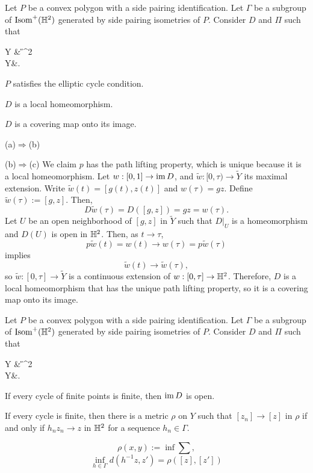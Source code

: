 \documentclass[a4paper]{article}
\begin{document}
\begin{prb}
Let $P$ be a convex polygon with a side pairing identification.
Let $\Gamma$ be a subgroup of $\operatorname{Isom}^+(\mathbb{H}^2)$ generated by side pairing isometries of $P$.
Consider $D$ and $\Pi$ such that
\begin{cd}
\tilde Y\dar{\Pi} & \H^2\\
Y&.
\end{cd}
\begin{parts}
\item $P$ satisfies the elliptic cycle condition.
\item $D$ is a local homeomorphism.
\item $D$ is a covering map onto its image.
\end{parts}
\end{prb}
\begin{pf}
(a)$\Rightarrow$(b)

(b)$\Rightarrow$(c)
We claim $p$ has the path lifting property, which is unique because it is a local homeomorphism.
Let $w:[0,1]\to\operatorname{im} D$, and $\tilde w:[0,\tau)\to\tilde Y$ its maximal extension.
Write $\tilde w(t)=[g(t),z(t)]$ and $w(\tau)=gz$.
Define $\tilde w(\tau):=[g,z]$.
Then,
\[D\tilde w(\tau)=D([g,z])=gz=w(\tau).\]
Let $U$ be an open neighborhood of $[g,z]$ in $\tilde Y$ such that $D|_U$ is a homeomorphism and $D(U)$ is open in $\mathbb{H}^2$.
Then, as $t\to\tau$,
\[p\tilde w(t)=w(t)\to w(\tau)=p\tilde w(\tau)\]
implies
\[\tilde w(t)\to\tilde w(\tau),\]
so $\tilde w:[0,\tau]\to\tilde Y$ is a continuous extension of $w:[0,\tau]\to\mathbb{H}^2$.
Therefore, $D$ is a local homeomorphism that has the unique path lifting property, so it is a covering map onto its image.
\end{pf}

\begin{prb}
Let $P$ be a convex polygon with a side pairing identification.
Let $\Gamma$ be a subgroup of $\operatorname{Isom}^+(\mathbb{H}^2)$ generated by side pairing isometries of $P$.
Consider $D$ and $\Pi$ such that
\begin{cd}
\tilde Y\dar{\Pi} & \H^2\\
Y&.
\end{cd}
\begin{parts}
\item If every cycle of finite points is finite, then $\operatorname{im} D$ is open.
\item If every cycle is finite, then there is a metric $\rho$ on $Y$ such that $[z_n]\to[z]$ in $\rho$ if and only if $h_nz_n\to z$ in $\mathbb{H}^2$ for a sequence $h_n\in\Gamma$.
\end{parts}
\end{prb}
\begin{pf}
\[\rho(x,y):=\inf\sum,\]
\[\inf_{h\in\Gamma}d(h^{-1}z,z')=\rho([z],[z'])\]
\end{pf}
\end{document}
